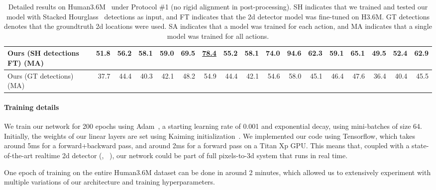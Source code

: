 \documentclass[10pt,twocolumn,letterpaper]{article}
\begin{document}
\begin{table*}
\begin{tabular}{@{}lrrrrrrrrrrrrrrrr@{}}
Ours (SH detections FT) (MA) & \bf{51.8}&  \bf{56.2}&	\bf{58.1}&	\bf{59.0}&	\bf{69.5}&	\underline{78.4}&	\bf{55.2}&	\bf{58.1}&	\bf{74.0}&	\bf{94.6}&	\bf{62.3}&	\bf{59.1}&	\bf{65.1}&	\bf{49.5}&	\bf{52.4}&	\bf{62.9}\\
\midrule
Ours (GT detections) (MA) & 37.7& 	44.4& 	40.3& 	42.1& 	48.2& 	54.9& 	44.4& 	42.1& 	54.6& 	58.0& 	45.1& 	46.4& 	47.6& 	36.4& 	40.4& 	45.5\\
\bottomrule
\end{tabular}
\vspace{3mm}
\caption{Detailed results on Human3.6M~\cite{h36m} under Protocol \#1 (no rigid alignment in post-processing). SH indicates that we trained and tested our model with Stacked Hourglass~\cite{stacked-hourglass} detections as input, and FT indicates that the 2d detector model was fine-tuned on H3.6M. GT detections denotes that the groundtruth 2d locations were used. SA indicates that a model was trained for each action, and MA indicates that a single model was trained for all actions.}
\label{tab:h36m}
\end{table*}

\paragraph{Training details}
We train our network
for 200 epochs
using Adam~\cite{adam}, a starting learning rate of 0.001 and exponential decay, using mini-batches of size 64. Initially, the weights of our linear layers are set using Kaiming initialization~\cite{he2015delving}. We implemented our code using Tensorflow,
which takes around 5ms for a forward+backward pass, and around 2ms for a forward pass on a 
Titan Xp
GPU. 
This means that, coupled with a state-of-the-art realtime 2d detector (\eg, ~\cite{cpm}), our network could be part of full pixels-to-3d system that runs in real time.

One epoch of training on the entire Human3.6M dataset can be done in around 2 minutes, which allowed us to extensively experiment with multiple variations of our architecture and training hyperparameters.
\end{document}
